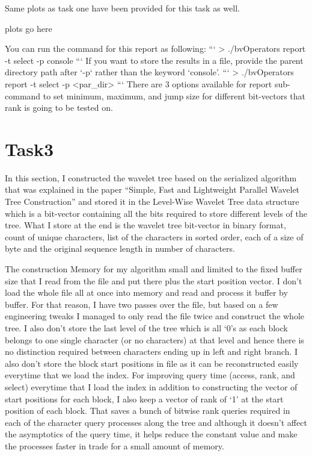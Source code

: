 \documentclass[11pt]{article}
\begin{document}
    Same plots as task one have been provided for this task as well.


    plots go here



    You can run the command for this report as following:
    ```
    > ./bvOperators report -t select -p console
    ```
    If you want to store the results in a file, provide the parent directory path after `-p` rather than the keyword `console'.
    ```
    > ./bvOperators report -t select -p <par_dir>
    ```
    There are 3 options available for report sub-command to set minimum, maximum, and jump size for different bit-vectors that rank is going to be tested on.

    \section{Task3}
    In this section, I constructed the wavelet tree based on the serialized algorithm that was explained in the paper
    ``Simple, Fast and Lightweight Parallel Wavelet Tree Construction'' and stored it in the Level-Wise Wavelet Tree data structure
    which is a bit-vector containing all the bits required to store different levels of the tree.
    What I store at the end is the wavelet tree bit-vector in binary format, count of unique characters, list of the characters in sorted order,
    each of a size of byte and the original sequence length in number of characters.

    The construction Memory for my algorithm small and limited to the fixed buffer size that I read from the file and put there
    plus the start position vector. I don't load the whole file all at once into memory and read and process it buffer by buffer.
    For that reason, I have two passes over the file, but based on a few engineering tweaks I managed to only read the file twice and
    construct the whole tree. I also don't store the last level of the tree which is all `0's as each block
    belongs to one single character (or no characters) at that level and hence there is no distinction required between
    characters ending up in left and right branch. I also don't store the block start positions in file as it can be
    reconstructed easily everytime that we load the index.
    For improving query time (access, rank, and select) everytime that I load the index in addition to constructing
    the vector of start positions for each block, I also keep a vector of rank of `1' at the start position of
    each block. That saves a bunch of bitwise rank queries required in each of the character query processes
    along the tree and although it doesn't affect the asymptotics of the query time, it helps reduce the constant
    value and make the processes faster in trade for a small amount of memory.
\end{document}
